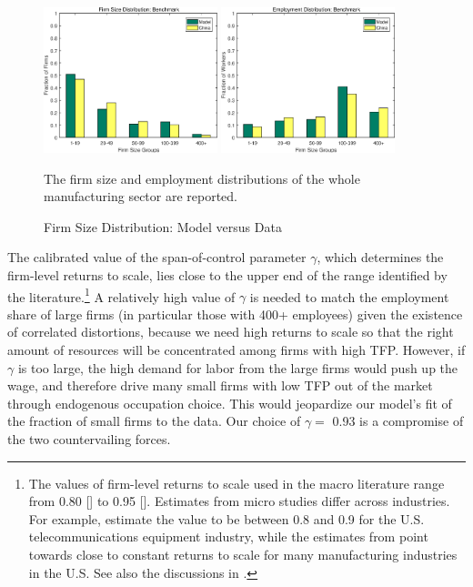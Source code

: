 \documentclass[AEJ]{AEA}
\begin{document}
\begin{figure}[t]
    \begin{center}
    \includegraphics[width=0.45\textwidth]{./Figures/benchfit_fs.eps}
    \includegraphics[width=0.45\textwidth]{./Figures/benchfit_es.eps}
    \caption{Firm Size Distribution: Model versus Data}
    \begin{figurenotes}
        The firm size and employment distributions of the whole manufacturing sector are reported.
    \end{figurenotes}
    \label{fig:fitness}
    \end{center}
\end{figure}

The calibrated value of the span-of-control parameter $\gamma$, which determines the firm-level returns to scale, lies close to the upper end of the range identified by the literature.\footnote{The values of firm-level returns to scale used in the macro literature range from 0.80 [\citet{Guneretal:2008}] to 0.95 [\citet{Bartelsmanetal:2013}]. Estimates from micro studies differ across industries. For example, \citet{OlleyPakes:1996} estimate the value to be between 0.8 and 0.9 for the U.S. telecommunications equipment industry, while the estimates from \citet{Bailyetal:1992} point towards close to constant returns to scale for many manufacturing industries in the U.S. See also the discussions in \citet{AtkesonKehoe:2005}.} A relatively high value of $\gamma$ is needed to match the employment share of large firms (in particular those with 400+ employees) given the existence of correlated distortions, because we need high returns to scale so that the right amount of resources will be concentrated among firms with high TFP. However, if $\gamma$ is too large, the high demand for labor from the large firms would push up the wage, and therefore drive many small firms with low TFP out of the market through endogenous occupation choice. This would jeopardize our model's fit of the fraction of small firms to the data. Our choice of $\gamma =$ 0.93 is a compromise of the two countervailing forces.
\end{document}
